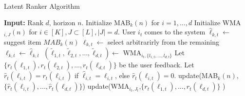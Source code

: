 

\begin{algorithm}
\caption{Latent Ranker Algorithm}
\label{alg:latent-rank}
  \begin{algorithmic}[1]
  \State \textbf{Input:} Rank $d$, horizon $n$.
  \State Initialize MAB$_k(n)$ for $i=1,...,d$
  \State Initialize WMA$_{i,J}(n)$ for $i \in [K], J \subset [L], |J| = d.$
      \State User $i_t$ comes to the system
      \State $\hat{{\ell}}_{k,t} \leftarrow$ suggest item $MAB_k(n)$
      \State ${\ell}_{k,t} \leftarrow$ select arbitrarirly from the remaining
      \Else
      \State $\ell_{k,t} \leftarrow \hat{\ell}_{k,t}$
      \EndIf
      \EndFor
      \State $(\tilde{\ell}_{1,t},\tilde{\ell}_{2,t},\dots,\tilde{\ell}_{d,t} )\leftarrow$ WMA$_{i_t,\{ l_{1,t},...,l_{d,t} \} }$ %
      \State Let  $\{ r_{t}(\ell_{1,t}), r_{t}(\ell_{2,t}),\dots,r_{t}(\ell_{d,t}) \}$ be the user feedback.
      \State Let $\hat{r}_t(\ell_{i,t}) = r_t(\ell_{i,t})$ if $\hat{\ell}_{i,t} = \ell_{i,t}$, else $\hat{r}_t(\ell_{i,t}) = 0.$
      \State update(MAB$_{k}(n)$, $\{ \hat{r}_t(\ell_{i,t}),...,\hat{r}_t(\ell_{d,t}) \}  $) 
      \State update(WMA$_{i_t,J_t}$,$\{ r_t(\ell_{1,t}),...,r_t(\ell_{d,t})\}$ )
    \EndFor
  \end{algorithmic}
\end{algorithm}